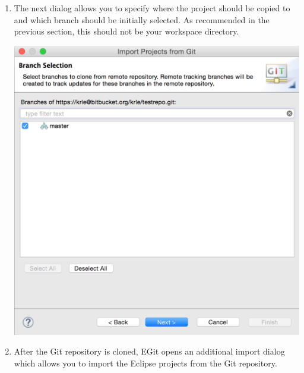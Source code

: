 \documentclass{article}
\begin{document}
\begin{enumerate}
\item The next dialog allows you to specify where the project should
  be copied to and which branch should be initially selected. As
  recommended in the previous section, this should not be your
  workspace directory.

\begin{center}
\includegraphics[scale=0.35]{figures/s16.png}
\end{center}

\item After the Git repository is cloned, EGit opens an additional import dialog which allows you to import the Eclipse projects from the Git repository.


\end{enumerate}
\end{document}
